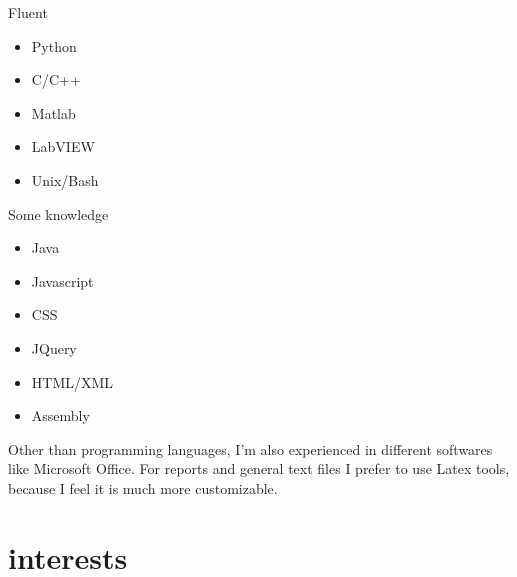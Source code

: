 \documentclass[]{friggeri-cv} %
\begin{document}
\setlength{\columnsep}{0cm}
\begin{multicols}{2}
	Fluent
	\begin{itemize} \itemsep0.5pt \parskip-1pt 
		\item Python
		\item C/C++
		\item Matlab
		\item LabVIEW
		\item Unix/Bash
	\end{itemize}
	Some knowledge
	\begin{itemize}
		\item Java
		\item Javascript
		\item CSS
		\item JQuery
		\item HTML/XML
		\item Assembly
	\end{itemize}
\end{multicols}

Other than programming languages, I'm also experienced in different softwares like Microsoft Office. For reports and general text files I prefer to use Latex tools, because I feel it is much more customizable.   





\newpage

\section{interests}



\end{document}
